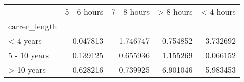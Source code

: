 \begin{tabular}{lrrrr}
\toprule
{} &  5 - 6 hours &  7 - 8 hours &  > 8 hours &  < 4 hours \\
carrer\_length &              &              &            &            \\
\midrule
< 4 years     &     0.047813 &     1.746747 &   0.754852 &   3.732692 \\
5 - 10 years  &     0.139125 &     0.655936 &   1.155269 &   0.066152 \\
> 10 years    &     0.628216 &     0.739925 &   6.901046 &   5.983453 \\
\bottomrule
\end{tabular}
